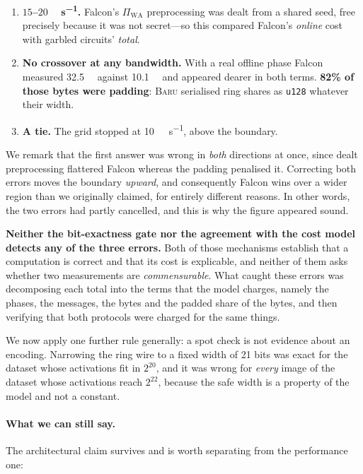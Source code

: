 \documentclass[11pt]{article}
\newcommand{\bt}[1]{\texttt{#1}}
\newcommand{\Baru}{\textsc{Baru}}
\begin{document}
\begin{enumerate}
  \item \textbf{$15$--$20$\,\si{\mega\bit\per\second}.} Falcon's
    $\Pi_{\mathrm{WA}}$ preprocessing was dealt from a shared seed, free precisely
    because it was not secret---so this compared Falcon's \emph{online} cost with
    garbled circuits' \emph{total}.
  \item \textbf{No crossover at any bandwidth.} With a real offline phase Falcon
    measured \SI{32.5}{\mega\byte} against \SI{10.1}{\mega\byte} and appeared dearer
    in both terms. \textbf{82\% of those bytes were padding}: \Baru{} serialised ring
    shares as \bt{u128} whatever their width.
  \item \textbf{A tie.} The grid stopped at \SI{10}{\mega\bit\per\second}, above the
    boundary.
\end{enumerate}

We remark that the first answer was wrong in \emph{both} directions at once, since dealt
preprocessing flattered Falcon whereas the padding penalised it. Correcting both errors moves the
boundary \emph{upward}, and consequently Falcon wins over a wider region than we originally
claimed, for entirely different reasons. In other words, the two errors had partly cancelled, and
this is why the figure appeared sound.

\textbf{Neither the bit-exactness gate nor the agreement with the cost model detects any of
the three errors.} Both of those mechanisms establish that a computation is correct and that its
cost is explicable, and neither of them asks whether two measurements are \emph{commensurable}.
What caught these errors was decomposing each total into the terms that the model charges, namely
the phases, the messages, the bytes and the padded share of the bytes, and then verifying that
both protocols were charged for the same things.

We now apply one further rule generally: a spot check is not evidence about an encoding.
Narrowing the ring wire to a fixed width of 21 bits was exact for the dataset whose activations fit
in $2^{20}$, and it was wrong for \emph{every} image of the dataset whose activations reach
$2^{22}$, because the safe width is a property of the model and not a constant.

\paragraph{What we can still say.} The architectural claim survives and is worth
separating from the performance one:
\end{document}
